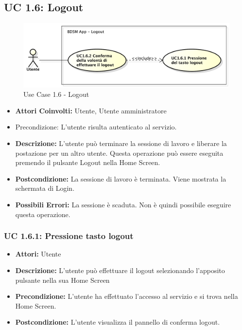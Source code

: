 \subsection{UC 1.6: Logout}

\begin{figure}[htbp]
    \centering
    \centerline{\includegraphics[scale=0.5]{./images/UC1_6.pdf}}
    \caption{Use Case 1.6 - Logout}
\end{figure}

\begin{itemize}
    \item \textbf{Attori Coinvolti:} Utente, Utente amministratore
    \item {Precondizione:} L'utente risulta autenticato al servizio.
    \item \textbf{Descrizione:} L'utente può terminare la sessione di lavoro e liberare la postazione per un altro utente. Questa operazione può essere eseguita premendo il pulsante Logout nella Home Screen.
    \item \textbf{Postcondizione:} La sessione di lavoro è terminata. Viene mostrata la schermata di Login.
    \item \textbf{Possibili Errori:} La sessione è scaduta. Non è quindi possibile eseguire questa operazione.
\end{itemize}

\subsubsection{UC 1.6.1: Pressione tasto logout}

\begin{itemize}
    \item \textbf{Attori:} Utente
    \item \textbf{Descrizione:} L'utente può effettuare il logout selezionando l'apposito pulsante nella sua Home Screen
    \item \textbf{Precondizione:} L'utente ha effettuato l'accesso al servizio e si trova nella Home Screen.
    \item \textbf{Postcondizione:} L'utente visualizza il pannello di conferma logout.
\end{itemize}

